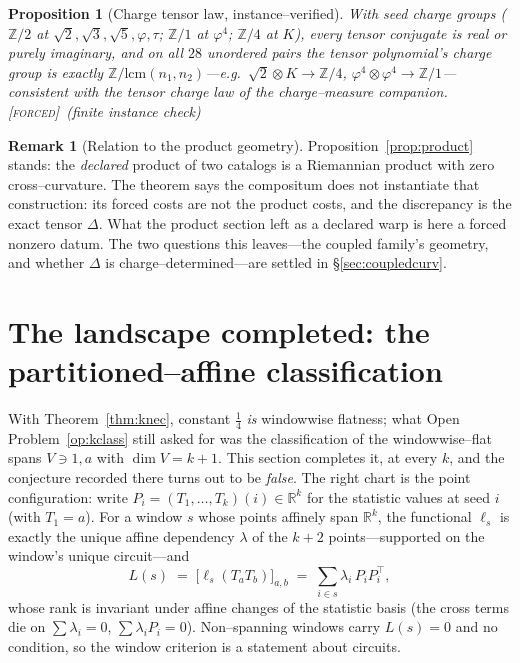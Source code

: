\documentclass[11pt]{article}
\newtheorem{proposition}[theorem]{Proposition}
\theoremstyle{definition}
\newtheorem{remark}[theorem]{Remark}
\newcommand{\ph}{\varphi}
\newcommand{\R}{\mathbb{R}}
\newcommand{\Z}{\mathbb{Z}}
\newcommand{\forcedtag}{{\scshape [forced]}}
\begin{document}
\begin{proposition}[Charge tensor law, instance--verified]\label{prop:chargelcm}
With seed charge groups ($\Z/2$ at $\sqrt2,\sqrt3,\sqrt5,\ph,\tau$; $\Z/1$ at $\ph^4$; $\Z/4$ at
$K$), every tensor conjugate is real or purely imaginary, and on all $28$ unordered pairs the
tensor polynomial's charge group is exactly $\Z/\mathrm{lcm}(n_1,n_2)$---e.g.\
$\sqrt2\otimes K\to\Z/4$, $\ph^4\otimes\ph^4\to\Z/1$---consistent with the tensor charge law of
the charge--measure companion. \forcedtag\ (finite instance check)
\end{proposition}

\begin{remark}[Relation to the product geometry]\label{rem:coupwarp}
Proposition~\ref{prop:product} stands: the \emph{declared} product of two catalogs is a Riemannian
product with zero cross--curvature. The theorem says the compositum does not instantiate that
construction: its forced costs are not the product costs, and the discrepancy is the exact tensor
$\Delta$. What the product section left as a declared warp is here a forced nonzero datum. The two
questions this leaves---the coupled family's geometry, and whether $\Delta$ is
charge--determined---are settled in \S\ref{sec:coupledcurv}.
\end{remark}

\section{The landscape completed: the partitioned--affine classification}\label{sec:landscape2}

With Theorem~\ref{thm:knec}, constant $\tfrac14$ \emph{is} windowwise flatness; what Open
Problem~\ref{op:kclass} still asked for was the classification of the windowwise--flat spans
$V\ni 1,a$ with $\dim V=k+1$. This section completes it, at every $k$, and the conjecture
recorded there turns out to be \emph{false}. The right chart is the point configuration: write
$P_i=(T_1,\dots,T_k)(i)\in\R^k$ for the statistic values at seed $i$ (with $T_1=a$). For a
window $s$ whose points affinely span $\R^k$, the functional $\ell_s$ is exactly the unique
affine dependency $\lambda$ of the $k+2$ points---supported on the window's unique circuit---and
\[
L(s)\;=\;\bigl[\ell_s(T_aT_b)\bigr]_{a,b}\;=\;\sum_{i\in s}\lambda_i\,P_iP_i^{\top},
\]
whose rank is invariant under affine changes of the statistic basis (the cross terms die on
$\sum\lambda_i=0$, $\sum\lambda_iP_i=0$). Non--spanning windows carry $L(s)=0$ and no condition,
so the window criterion is a statement about circuits.
\end{document}
